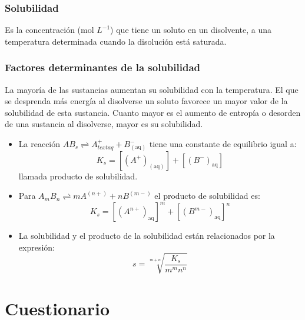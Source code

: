 \documentclass[11pt]{article}
\newcounter{subsubsubsection}[subsubsection]
\begin{document}
    \subsubsection{Solubilidad}
        Es la concentración (mol $L^{-1}$) que tiene un soluto en un disolvente, a una temperatura determinada cuando la disolución está saturada.
    
    \subsubsection{Factores determinantes de la solubilidad}
            La mayoría de las sustancias aumentan su solubilidad con la temperatura.
            El que se desprenda más energía al disolverse un soluto favorece un mayor valor de la solubilidad de esta sustancia.
            Cuanto mayor es el aumento de entropía o desorden de una sustancia al disolverse, mayor es su solubilidad.
        \begin{itemize}
            \item La reacción $AB_{s} \rightleftharpoons A^{+}_{text{aq}} + B^{-}_{(\text{aq})}$ tiene una constante de equilibrio igual a: $$K_s = [(A^{+})_{(\text{aq})}]  + [(B^{-})_{\text{aq}}]$$ llamada producto de solubilidad. 
            \item Para $A_mB_n \rightleftharpoons mA^{(n+)} + nB^{(m-)}$ el producto de solubilidad es: $$K_s = [(A^{n+})_{\text{aq}}]^{m}  + [(B^{m-})_{\text{aq}}]^{n}$$
            \item La solubilidad y el producto de la solubilidad están relacionados por la expresión: $$ s = \sqrt[m+n]{\frac{K_s}{m^m n^n}}$$        
        \end{itemize}
    \section{Cuestionario}
\end{document}
